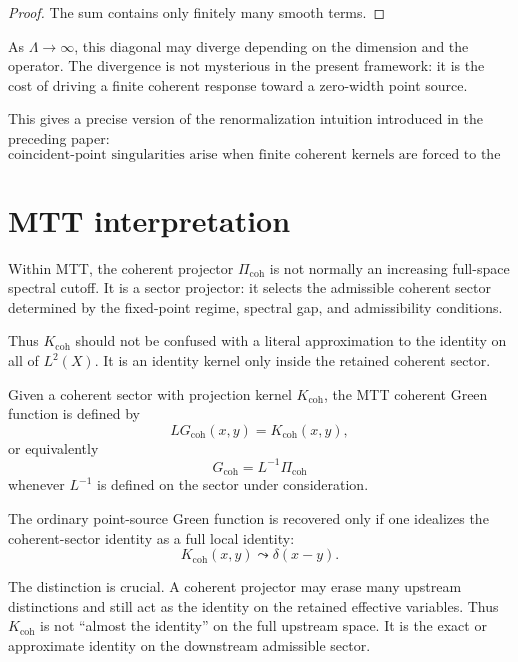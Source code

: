 \documentclass[11pt]{article}
\begin{document}
\begin{proof}
The sum contains only finitely many smooth terms.
\end{proof}

\begin{remark}
As \(\Lambda\to\infty\), this diagonal may diverge depending on the dimension and the operator. The divergence is not mysterious in the present framework: it is the cost of driving a finite coherent response toward a zero-width point source.
\end{remark}

This gives a precise version of the renormalization intuition introduced in the preceding paper:
\[
\boxed{
\text{coincident-point singularities arise when finite coherent kernels are forced to the delta limit.}
}
\]

\section{MTT interpretation}

Within MTT, the coherent projector \(\Pi_{\mathrm{coh}}\) is not normally an increasing full-space spectral cutoff. It is a sector projector: it selects the admissible coherent sector determined by the fixed-point regime, spectral gap, and admissibility conditions.

Thus \(K_{\mathrm{coh}}\) should not be confused with a literal approximation to the identity on all of \(L^2(X)\). It is an identity kernel only inside the retained coherent sector.

\begin{definition}
Given a coherent sector with projection kernel \(K_{\mathrm{coh}}\), the MTT coherent Green function is defined by
\begin{equation}
LG_{\mathrm{coh}}(x,y)=K_{\mathrm{coh}}(x,y),
\end{equation}
or equivalently
\begin{equation}
G_{\mathrm{coh}}=L^{-1}\Pi_{\mathrm{coh}}
\end{equation}
whenever \(L^{-1}\) is defined on the sector under consideration.
\end{definition}

The ordinary point-source Green function is recovered only if one idealizes the coherent-sector identity as a full local identity:
\[
K_{\mathrm{coh}}(x,y)\leadsto \delta(x-y).
\]

\begin{remark}
The distinction is crucial. A coherent projector may erase many upstream distinctions and still act as the identity on the retained effective variables. Thus \(K_{\mathrm{coh}}\) is not ``almost the identity'' on the full upstream space. It is the exact or approximate identity on the downstream admissible sector.
\end{remark}
\end{document}
